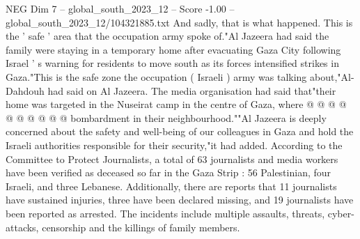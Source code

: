 \begin{textsample}{NEG Dim 7 – global\_south\_2023\_12 – Score -1.00 – global\_south\_2023\_12/104321885.txt}
And sadly, that is what happened.
This is the ' safe ' area that the occupation army spoke of."Al Jazeera had said the family were staying in a temporary home after evacuating Gaza City following Israel ' s warning for residents to move south as its forces intensified strikes in Gaza."This is the safe zone the occupation ( Israeli ) army was talking about,"Al-Dahdouh had said on Al Jazeera.
The media organisation had said that"their home was targeted in the Nuseirat camp in the centre of Gaza, where @ @ @ @ @ @ @ @ @ @ bombardment in their neighbourhood.""Al Jazeera is deeply concerned about the safety and well-being of our colleagues in Gaza and hold the Israeli authorities responsible for their security,"it had added.
According to the Committee to Protect Journalists, a total of 63 journalists and media workers have been verified as deceased so far in the Gaza Strip : 56 Palestinian, four Israeli, and three Lebanese.
Additionally, there are reports that 11 journalists have sustained injuries, three have been declared missing, and 19 journalists have been reported as arrested.
The incidents include multiple assaults, threats, cyber-attacks, censorship and the killings of family members.

\end{textsample}
